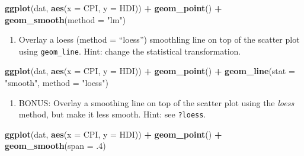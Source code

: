 \documentclass[]{book}
\newenvironment{Shaded}{\begin{snugshade}}{\end{snugshade}}
\newcommand{\KeywordTok}[1]{\textcolor[rgb]{0.13,0.29,0.53}{\textbf{#1}}}
\newcommand{\DataTypeTok}[1]{\textcolor[rgb]{0.13,0.29,0.53}{#1}}
\newcommand{\DecValTok}[1]{\textcolor[rgb]{0.00,0.00,0.81}{#1}}
\newcommand{\StringTok}[1]{\textcolor[rgb]{0.31,0.60,0.02}{#1}}
\newcommand{\OperatorTok}[1]{\textcolor[rgb]{0.81,0.36,0.00}{\textbf{#1}}}
\newcommand{\NormalTok}[1]{#1}
\providecommand{\tightlist}{%
  \setlength{\itemsep}{0pt}\setlength{\parskip}{0pt}}
\begin{document}
\begin{Shaded}
\begin{Highlighting}[]
\KeywordTok{ggplot}\NormalTok{(dat, }\KeywordTok{aes}\NormalTok{(}\DataTypeTok{x =}\NormalTok{ CPI, }\DataTypeTok{y =}\NormalTok{ HDI)) }\OperatorTok{+}
\StringTok{  }\KeywordTok{geom_point}\NormalTok{() }\OperatorTok{+}
\StringTok{  }\KeywordTok{geom_smooth}\NormalTok{(}\DataTypeTok{method =} \StringTok{"lm"}\NormalTok{)}
\end{Highlighting}
\end{Shaded}

\begin{enumerate}
\def\labelenumi{\arabic{enumi}.}
\setcounter{enumi}{3}
\tightlist
\item
  Overlay a loess (method = ``loess'') smoothling line on top of the
  scatter plot using \texttt{geom\_line}. Hint: change the statistical
  transformation.
\end{enumerate}

\begin{Shaded}
\begin{Highlighting}[]
\KeywordTok{ggplot}\NormalTok{(dat, }\KeywordTok{aes}\NormalTok{(}\DataTypeTok{x =}\NormalTok{ CPI, }\DataTypeTok{y =}\NormalTok{ HDI)) }\OperatorTok{+}
\StringTok{  }\KeywordTok{geom_point}\NormalTok{() }\OperatorTok{+}
\StringTok{  }\KeywordTok{geom_line}\NormalTok{(}\DataTypeTok{stat =} \StringTok{"smooth"}\NormalTok{, }\DataTypeTok{method =} \StringTok{"loess"}\NormalTok{)}
\end{Highlighting}
\end{Shaded}

\begin{enumerate}
\def\labelenumi{\arabic{enumi}.}
\setcounter{enumi}{3}
\tightlist
\item
  BONUS: Overlay a smoothing line on top of the scatter plot using the
  \emph{loess} method, but make it less smooth. Hint: see
  \texttt{?loess}.
\end{enumerate}

\begin{Shaded}
\begin{Highlighting}[]
\KeywordTok{ggplot}\NormalTok{(dat, }\KeywordTok{aes}\NormalTok{(}\DataTypeTok{x =}\NormalTok{ CPI, }\DataTypeTok{y =}\NormalTok{ HDI)) }\OperatorTok{+}
\StringTok{  }\KeywordTok{geom_point}\NormalTok{() }\OperatorTok{+}
\StringTok{  }\KeywordTok{geom_smooth}\NormalTok{(}\DataTypeTok{span =}\NormalTok{ .}\DecValTok{4}\NormalTok{)}
\end{Highlighting}
\end{Shaded}
\end{document}
